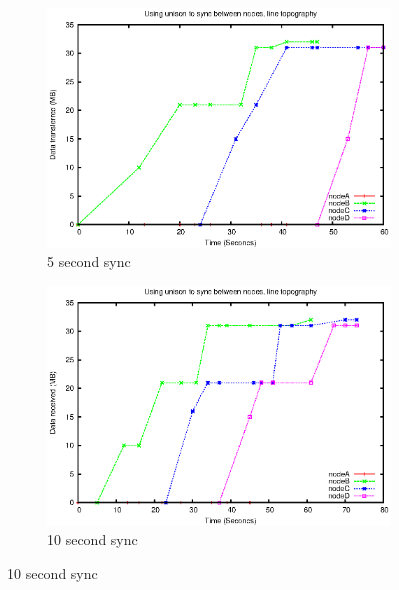 \documentclass[12pt]{article}
\begin{document}
\begin{figure}[htp]
    \begin{subfigure}[b]{0.5\linewidth}
        \centering
        \includegraphics[scale=0.5]{images/line-uni-10-5.eps}
        \caption{5 second sync}
        \label{fig:line_uni_10_5}
    \end{subfigure}
    \begin{subfigure}[b]{0.5\linewidth}
        \centering
        \includegraphics[scale=0.5]{images/line-uni-10-10.eps}
        \caption{10 second sync}
        \label{fig:line_uni_10_10}
    \end{subfigure}


\end{figure}
\end{document}
